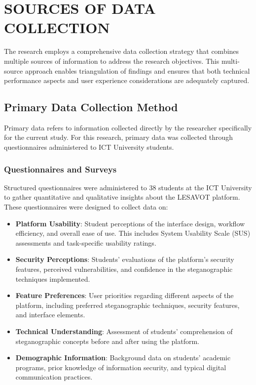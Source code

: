 \documentclass[12pt, a4paper, oneside]{book}
\begin{document}
\section{SOURCES OF DATA COLLECTION}

The research employs a comprehensive data collection strategy that combines multiple sources of information to address the research objectives. This multi-source approach enables triangulation of findings and ensures that both technical performance aspects and user experience considerations are adequately captured.

\subsection{Primary Data Collection Method}

Primary data refers to information collected directly by the researcher specifically for the current study. For this research, primary data was collected through questionnaires administered to ICT University students.

\subsubsection{Questionnaires and Surveys}
Structured questionnaires were administered to 38 students at the ICT University to gather quantitative and qualitative insights about the LESAVOT platform. These questionnaires were designed to collect data on:

\begin{itemize}[leftmargin=*]
    \item \textbf{Platform Usability}: Student perceptions of the interface design, workflow efficiency, and overall ease of use. This includes System Usability Scale (SUS) assessments and task-specific usability ratings.

    \item \textbf{Security Perceptions}: Students' evaluations of the platform's security features, perceived vulnerabilities, and confidence in the steganographic techniques implemented.

    \item \textbf{Feature Preferences}: User priorities regarding different aspects of the platform, including preferred steganographic techniques, security features, and interface elements.

    \item \textbf{Technical Understanding}: Assessment of students' comprehension of steganographic concepts before and after using the platform.

    \item \textbf{Demographic Information}: Background data on students' academic programs, prior knowledge of information security, and typical digital communication practices.
\end{itemize}
\end{document}

